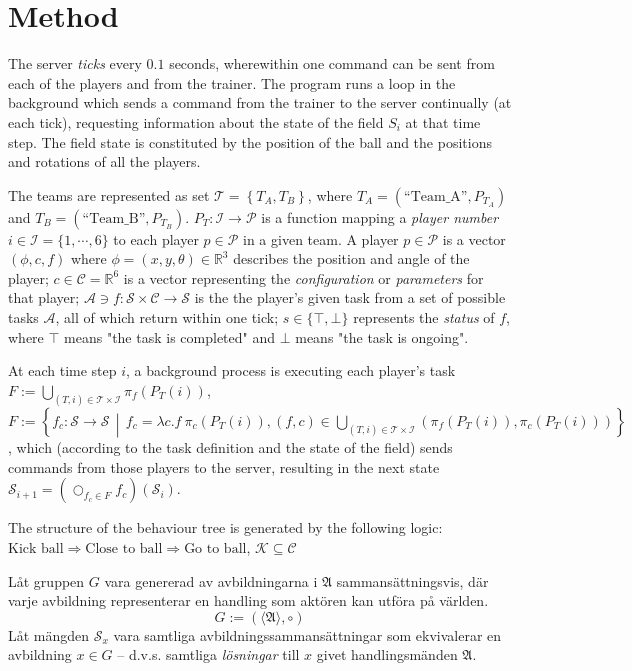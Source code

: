 \documentclass[10pt,a4paper]{article}
\begin{document}
\section{Method}

The server \textit{ticks} every \(0.1\) seconds, wherewithin one command can be sent from each of the players and from the trainer. The program runs a loop in the background which sends a command from the trainer to the server continually (at each tick), requesting information about the state of the field \(S_i\) at that time step. The field state is constituted by the position of the ball and the positions and rotations of all the players.

The teams are represented as set \(\mathcal{T} = \left\{ T_A, T_B \right\}\), where \(T_A = (\text{``Team\_A''}, P_{T_A})\) and \(T_B = (\text{``Team\_B''}, P_{T_B})\). \(P_T : \mathcal{I} \to \mathcal{P} \) is a function mapping a \textit{player number} \(i\in \mathcal{I} = \{1,\cdots,6\}\) to each player \(p \in \mathcal{P}\) in a given team. A player \(p\in \mathcal{P}\) is a vector \((\phi, c, f)\) where \(\phi = (x, y, \theta) \in \mathbb{R}^3\) describes the position and angle of the player; \(c \in \mathcal{C} = \mathbb{R}^6\) is a vector representing the \textit{configuration} or \textit{parameters} for that player; \(\mathcal{A} \ni f:\mathcal{S}\times \mathcal{C} \to \mathcal{S}\) is the the player's given task from a set of possible tasks \(\mathcal{A}\), all of which return within one tick; \(s \in \{\top,\bot\}\) represents the \textit{status} of \(f\), where \(\top\) means "the task is completed" and \(\bot\) means "the task is ongoing".

At each time step \(i\), a background process is executing each player's task \(F := \bigcup_{(T,i)\in\mathcal{T} \times \mathcal{I}} \pi_f(P_T(i)) \), \(F := \left\{ f_c:\mathcal{S}\to\mathcal{S} \,\middle|\, f_c = \lambda c.f\ \pi_c(P_T(i)), (f, c) \in \bigcup_{(T,i)\in\mathcal{T} \times \mathcal{I}} ( \pi_f(P_T(i)), \pi_c(P_T(i))) \right\}\), which (according to the task definition and the state of the field) sends commands from those players to the server, resulting in the next state \(\mathcal{S}_{i+1} = \left(\bigcirc_{f_c\in F} f_c\right)(\mathcal{S}_i)\).

The structure of the behaviour tree is generated by the following logic: \(\text{Kick ball} \Rightarrow \text{Close to ball} \Rightarrow \text{Go to ball}\), \(\mathscr{K} \subseteq \mathscr{C}\)

Låt gruppen \(G\) vara genererad av avbildningarna i \(\mathfrak{A}\) sammansättningsvis, där varje avbildning representerar en handling som aktören kan utföra på världen.
\begin{equation}
		G:=\left(\langle\mathfrak{A}\rangle,\circ\right)
\end{equation}
Låt mängden \(\mathscr{S}_x\) vara samtliga avbildningssammansättningar som ekvivalerar en avbildning \(x\in G\) -- d.v.s. samtliga \textit{lösningar} till \(x\) givet handlingsmänden \(\mathfrak{A}\).
\end{document}
